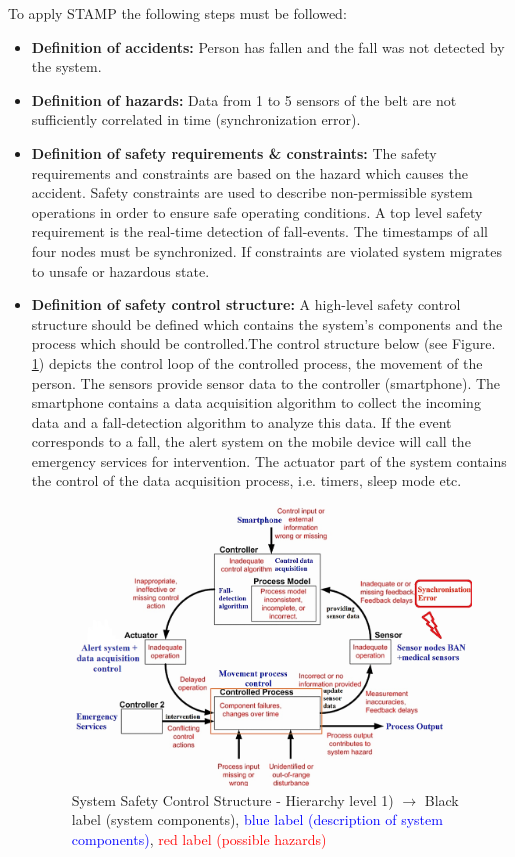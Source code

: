\documentclass[review]{elsarticle}
\begin{document}
To apply STAMP the following steps must be followed:

\begin{itemize}
	\item \textbf{Definition of accidents:} Person has fallen and the fall was not detected by the system.
	\item \textbf{Definition of hazards:} Data from 1 to 5 sensors of the belt are not sufficiently correlated in time (synchronization error).
	\item \textbf{Definition of safety requirements \& constraints:} The safety requirements and constraints are based on the hazard which causes the accident. Safety constraints are used to describe non-permissible system operations in order to ensure safe operating conditions. A top level safety requirement is the real-time detection of fall-events. The timestamps of all four nodes must be synchronized. If constraints are violated system migrates to unsafe or hazardous state.
	\item \textbf{Definition of safety control structure:}
	A high-level safety control structure should be defined which contains the system's components and the process which should be controlled.The control structure below (see Figure. \ref{fig:STAMPLevel1}) depicts the control loop of the controlled process, the movement of the person.
	The sensors provide sensor data to the controller (smartphone). The smartphone contains a data acquisition algorithm to collect the incoming data and a fall-detection algorithm to analyze this data. If the event corresponds to a fall, the alert system on the mobile device will call the emergency services for intervention. The actuator part of the system contains the control of the data acquisition process, i.e. timers, sleep mode etc.
	\begin{figure}[!ht]
		\centering
		\includegraphics[scale=0.44]{images/STAMP-SynchError}
		\caption[System Safety Control Structure]{System Safety Control Structure - Hierarchy level 1) $\rightarrow$ Black label (system components), \textcolor{blue}{blue label (description of system components)}, \textcolor{red}{red label (possible hazards)}}
		\label{fig:STAMPLevel1}
	\end{figure}


\end{itemize}
\end{document}
